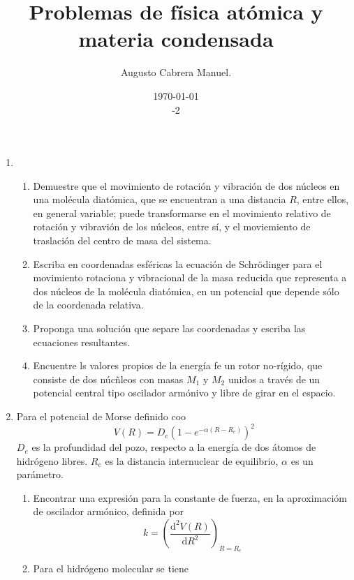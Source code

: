 \documentclass[]{article}
\title{Problemas de física atómica y materia condensada}
\author{Augusto Cabrera Manuel.}
\date{\today\\ \ser 7 \sem 2018-2 }
\begin{document}
\maketitle

\begin{enumerate}
\item \begin{enumerate}
\item Demuestre que el movimiento de rotación y vibración de dos núcleos en una molécula diatómica, que se encuentran a una distancia $R$, entre ellos, en general variable; puede transformarse en el movimiento relativo de rotación y vibravión de los núcleos, entre sí, y el moviemiento de traslación del centro de masa del sistema.
\item Escriba en coordenadas esféricas la ecuación de Schrödinger para el movimiento rotaciona y vibracional de la masa reducida  que representa a dos núcleos de la molécula diatómica, en un potencial que depende sólo de la coordenada relativa.
\item Proponga una solución que separe las coordenadas  y escriba las ecuaciones resultantes.
\item Encuentre ls valores propios de la energía fe un rotor no-rígido, que consiste de dos núcñleos con masas $M_1$ y $M_2$ unidos a través de un potencial central tipo oscilador armónivo y libre de girar en el espacio. 
\end{enumerate}
\item Para el potencial de Morse definido coo
$$
V(R)= D_e\left(1-e^{-\alpha\left(R-R_e\right)}\right)^2
$$
$D_e$ es la profundidad del pozo, respecto a la energía de dos átomos de hidrógeno libres. $R_e$ es la distancia  internuclear de equilibrio, $\alpha$ es un parámetro.
\begin{enumerate}
\item Encontrar una expresión para la constante de fuerza, en la aproximacióm de oscilador armónico, definida por
$$
k=\left(\frac{\mathrm{d}^2V(R)}{\mathrm{d} R^2}\right)_{R=R_e}
$$
\item Para el hidrógeno molecular se tiene
\end{enumerate}
\end{enumerate}
\end{document}
